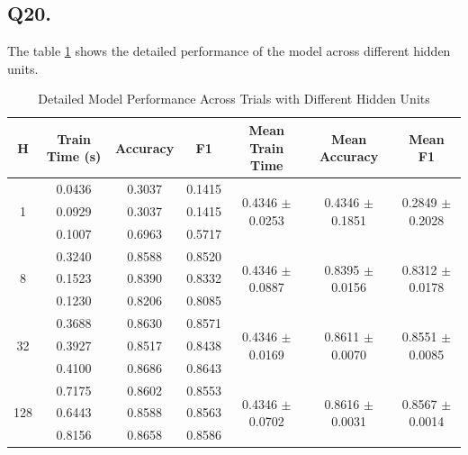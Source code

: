 \documentclass{article}
\begin{document}
\subsection*{Q20.}

The table \ref{tab:detailed_model_performance} shows the detailed performance of the model across different hidden units.

\begin{table}[htbp]
    \centering
    \begin{tabular}{ccccccc}
    \toprule
    H &  Train Time (s) & Accuracy & F1 & Mean Train Time & Mean Accuracy & Mean F1  \\
    \midrule
    \multirow{3}{*}{1} & 0.0436 & 0.3037 & 0.1415 & \multirow{3}{*}{0.4346 $\pm$ 0.0253} & \multirow{3}{*}{0.4346 $\pm$ 0.1851} & \multirow{3}{*}{0.2849 $\pm$ 0.2028} \\
                       & 0.0929 & 0.3037 & 0.1415 & & \\
                       & 0.1007 & 0.6963 & 0.5717 & & \\
    \midrule
    \multirow{3}{*}{8} & 0.3240 & 0.8588 & 0.8520 & \multirow{3}{*}{0.4346 $\pm$ 0.0887} & \multirow{3}{*}{0.8395 $\pm$ 0.0156} & \multirow{3}{*}{0.8312 $\pm$ 0.0178} \\
                       & 0.1523 & 0.8390 & 0.8332 & & \\
                       & 0.1230 & 0.8206 & 0.8085 & & \\
    \midrule
    \multirow{3}{*}{32} & 0.3688 & 0.8630 & 0.8571 & \multirow{3}{*}{0.4346 $\pm$ 0.0169} & \multirow{3}{*}{0.8611 $\pm$ 0.0070} & \multirow{3}{*}{0.8551 $\pm$ 0.0085} \\
                        & 0.3927 & 0.8517 & 0.8438 & & \\
                        & 0.4100 & 0.8686 & 0.8643 & & \\
    \midrule
    \multirow{3}{*}{128} & 0.7175 & 0.8602 & 0.8553 & \multirow{3}{*}{0.4346 $\pm$ 0.0702} & \multirow{3}{*}{0.8616 $\pm$ 0.0031} & \multirow{3}{*}{0.8567 $\pm$ 0.0014} \\
                         & 0.6443 & 0.8588 & 0.8563 & & \\
                         & 0.8156 & 0.8658 & 0.8586 & & \\
    \bottomrule
    \end{tabular}
    \caption{Detailed Model Performance Across Trials with Different Hidden Units}
    \label{tab:detailed_model_performance}
\end{table}
    
\end{document}
